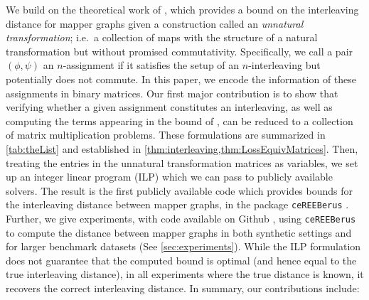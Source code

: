 We build on the theoretical work of \cite{chambers2023bounding}, which provides a bound on the interleaving distance for mapper graphs given a construction called an \emph{unnatural transformation}; i.e.~a collection of maps with the structure of a natural transformation but without promised commutativity.
Specifically, we call a pair $(\phi,\psi)$ an $n$-assignment if it satisfies the setup of an $n$-interleaving but potentially does not commute.
In this paper, we encode the information of these assignments in binary matrices. 
Our first major contribution is to show that verifying whether a given assignment constitutes an interleaving, as well as computing the terms appearing in the bound of \cite{chambers2023bounding}, can be reduced to a collection of matrix multiplication problems. These formulations are summarized in \cref{tab:theList} and established in \cref{thm:interleaving,thm:LossEquivMatrices}.
Then, treating the entries in the unnatural transformation matrices as variables, we set up an integer linear program (ILP) which we can pass to publicly available solvers. 
The result is the first publicly available code which provides bounds for the interleaving distance between mapper graphs, in the package \texttt{ceREEBerus} \cite{cereeberus}. 
Further, we give experiments, with code available on Github \cite{losspapergithubexperiments}, using \texttt{ceREEBerus} to compute the distance between mapper graphs in both synthetic settings and for larger benchmark datasets (See \cref{sec:experiments}).
While the ILP formulation does not guarantee that the computed bound is optimal (and hence equal to the true interleaving distance), in all experiments where the true distance is known, it recovers the correct interleaving distance.
In summary, our contributions include: 
